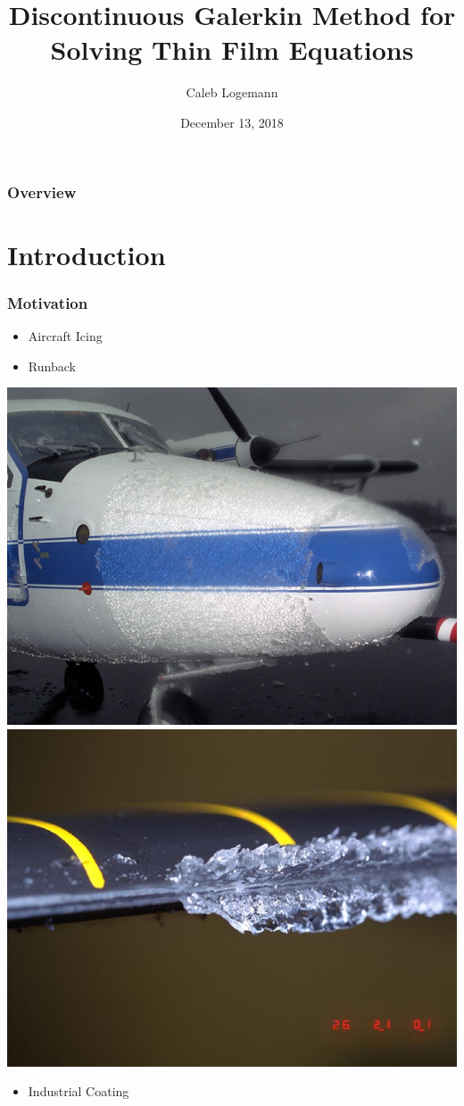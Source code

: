 \documentclass[10pt]{beamer}
\title[]{Discontinuous Galerkin Method for Solving Thin Film Equations} %
\author{Caleb Logemann} %
\institute[Iowa State University]{%
Mathematics Department, Iowa State University \\ %
\medskip
\textit{logemann@iastate.edu}} %
\date{December 13, 2018} %
\begin{document}
  \begin{frame}
    \titlepage{}
  \end{frame}

  \begin{frame}
    \frametitle{Overview}
    \tableofcontents
  \end{frame}

  \section{Introduction}
    \begin{frame}
      \frametitle{Motivation}
      \begin{itemize}
        \item Aircraft Icing
        \item Runback
      \end{itemize}
      \begin{center}
        \includegraphics[scale=0.2]{Figures/Icing_on_a_plane.jpg}
        \hspace{0.1in}
        \includegraphics[scale=0.2]{Figures/Icing_on_a_rotor.jpg}
      \end{center}
      \begin{itemize}
        \item Industrial Coating
      \end{itemize}
    \end{frame}
\end{document}
